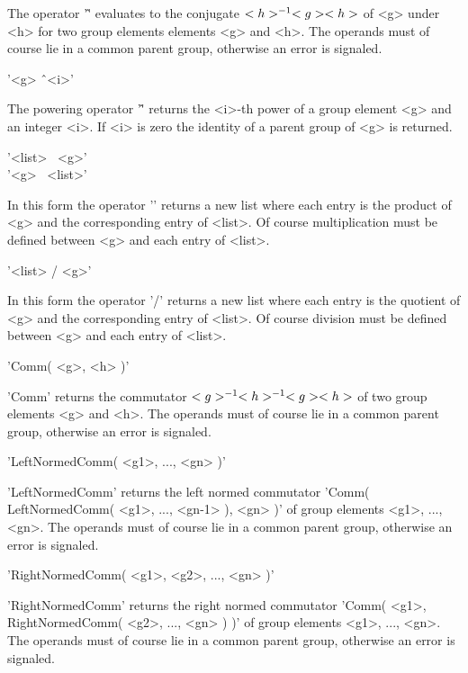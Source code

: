 The operator '\^' evaluates to the conjugate $<h>^{-1}\*  <g>\*  <h>$  of
<g> under  <h> for two group elements elements <g> and <h>.  The operands
must  of course  lie  in  a  common parent  group, otherwise an  error is
signaled.

\vspace{5mm}
'<g> \^\ <i>'%

The powering operator  '\^' returns the  <i>-th power  of a group element
<g> and an integer <i>.  If <i> is zero the identity of a parent group of
<g> is returned.

\vspace{5mm}
'<list> \*\ <g>'%
\\
'<g> \*\ <list>'

In this form the operator '\*' returns a new list where each entry is the
product of <g>  and the   corresponding  entry  of <list>.    Of   course
multiplication must be defined between <g> and each entry of <list>.

\vspace{5mm}
'<list> / <g>'%

In this form the operator '/' returns a new list where  each entry is the
quotient of  <g>  and  the  corresponding entry  of   <list>.   Of course
division must be defined between <g> and each entry of <list>.

\vspace{5mm}
'Comm( <g>, <h> )'%

'Comm'  returns the commutator $<g>^{-1}\*  <h>^{-1}\* <g>\*  <h>$ of two
group elements <g> and <h>.  The operands  must of course lie in a common
parent group, otherwise an error is signaled.

\vspace{5mm}
'LeftNormedComm( <g1>, ..., <gn> )'%

'LeftNormedComm' returns the left  normed commutator 
'Comm( LeftNormedComm( <g1>, ..., <gn-1> ), <gn> )'  of  group   elements
<g1>, ..., <gn>. The operands must  of  course  lie  in a  common  parent
group, otherwise an error is signaled.

\vspace{5mm}
'RightNormedComm( <g1>, <g2>, ..., <gn> )'%

'RightNormedComm' returns the right  normed commutator 
'Comm( <g1>, RightNormedComm( <g2>, ..., <gn> ) )'  of   group   elements
<g1>, ..., <gn>. The operands must  of  course  lie  in a  common  parent
group, otherwise an error is signaled.

